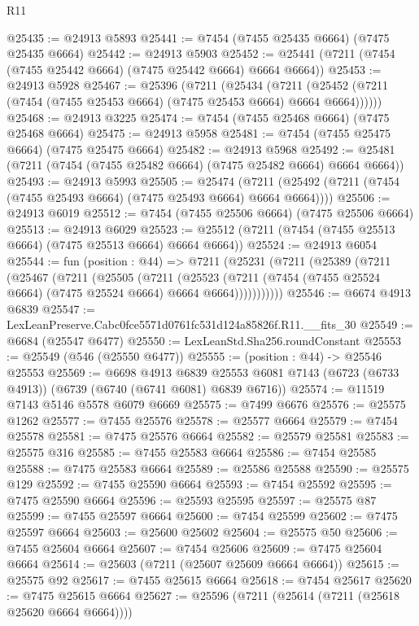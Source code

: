 \begin{lexlean}{R11}
\begin{coremodule}
@25435 := @24913 @5893
@25441 := @7454 (@7455 @25435 @6664) (@7475 @25435 @6664)
@25442 := @24913 @5903
@25452 := @25441 (@7211 (@7454 (@7455 @25442 @6664) (@7475 @25442 @6664) @6664 @6664))
@25453 := @24913 @5928
@25467 := @25396
    (@7211
      (@25434
        (@7211 (@25452 (@7211 (@7454 (@7455 @25453 @6664) (@7475 @25453 @6664) @6664 @6664))))))
@25468 := @24913 @3225
@25474 := @7454 (@7455 @25468 @6664) (@7475 @25468 @6664)
@25475 := @24913 @5958
@25481 := @7454 (@7455 @25475 @6664) (@7475 @25475 @6664)
@25482 := @24913 @5968
@25492 := @25481 (@7211 (@7454 (@7455 @25482 @6664) (@7475 @25482 @6664) @6664 @6664))
@25493 := @24913 @5993
@25505 := @25474
    (@7211 (@25492 (@7211 (@7454 (@7455 @25493 @6664) (@7475 @25493 @6664) @6664 @6664))))
@25506 := @24913 @6019
@25512 := @7454 (@7455 @25506 @6664) (@7475 @25506 @6664)
@25513 := @24913 @6029
@25523 := @25512 (@7211 (@7454 (@7455 @25513 @6664) (@7475 @25513 @6664) @6664 @6664))
@25524 := @24913 @6054
@25544 := fun (position : @44) =>
  @7211
    (@25231
      (@7211
        (@25389
          (@7211
            (@25467
              (@7211
                (@25505
                  (@7211
                    (@25523
                      (@7211 (@7454 (@7455 @25524 @6664) (@7475 @25524 @6664) @6664 @6664)))))))))))
@25546 := @6674 @4913 @6839
@25547 := LexLeanPreserve.Cabc0fce5571d0761fc531d124a85826f.R11.__fits_30
@25549 := @6684 (@25547 @6477)
@25550 := LexLeanStd.Sha256.roundConstant
@25553 := @25549 (@546 (@25550 @6477))
@25555 := (position : @44) -> @25546 @25553
@25569 := @6698
    @4913
    @6839
    @25553
    @6081
    @7143
    (@6723 (@6733 @4913))
    (@6739 (@6740 (@6741 @6081) @6839 @6716))
@25574 := @11519 @7143 @5146 @5578 @6079 @6669
@25575 := @7499 @6676
@25576 := @25575 @1262
@25577 := @7455 @25576
@25578 := @25577 @6664
@25579 := @7454 @25578
@25581 := @7475 @25576 @6664
@25582 := @25579 @25581
@25583 := @25575 @316
@25585 := @7455 @25583 @6664
@25586 := @7454 @25585
@25588 := @7475 @25583 @6664
@25589 := @25586 @25588
@25590 := @25575 @129
@25592 := @7455 @25590 @6664
@25593 := @7454 @25592
@25595 := @7475 @25590 @6664
@25596 := @25593 @25595
@25597 := @25575 @87
@25599 := @7455 @25597 @6664
@25600 := @7454 @25599
@25602 := @7475 @25597 @6664
@25603 := @25600 @25602
@25604 := @25575 @50
@25606 := @7455 @25604 @6664
@25607 := @7454 @25606
@25609 := @7475 @25604 @6664
@25614 := @25603 (@7211 (@25607 @25609 @6664 @6664))
@25615 := @25575 @92
@25617 := @7455 @25615 @6664
@25618 := @7454 @25617
@25620 := @7475 @25615 @6664
@25627 := @25596 (@7211 (@25614 (@7211 (@25618 @25620 @6664 @6664))))

\end{coremodule}
\end{lexlean}
